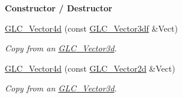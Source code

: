 \begin{Indent}{\bf Constructor / Destructor}
\begin{DoxyCompactItemize}
\hyperlink{class_g_l_c___vector4d_ac522c7181e4d79185a30ff42feca9e2a}{G\-L\-C\-\_\-\-Vector4d} (const \hyperlink{class_g_l_c___vector3df}{G\-L\-C\-\_\-\-Vector3df} \&Vect)
\begin{DoxyCompactList}\small\item\em Copy from an \hyperlink{class_g_l_c___vector3d}{G\-L\-C\-\_\-\-Vector3d}. \end{DoxyCompactList}\item 
\hyperlink{class_g_l_c___vector4d_af3b608d5d752e8e24a905d1575cf5c6f}{G\-L\-C\-\_\-\-Vector4d} (const \hyperlink{class_g_l_c___vector2d}{G\-L\-C\-\_\-\-Vector2d} \&Vect)
\begin{DoxyCompactList}\small\item\em Copy from an \hyperlink{class_g_l_c___vector3d}{G\-L\-C\-\_\-\-Vector3d}. \end{DoxyCompactList}\end{DoxyCompactItemize}
\end{Indent}
